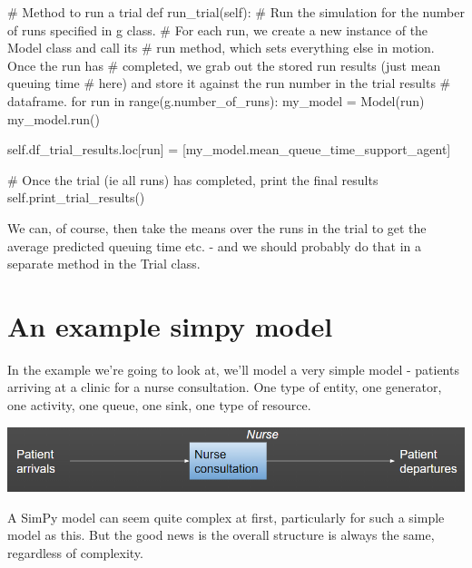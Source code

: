 \documentclass[
  letterpaper,
  DIV=11,
  numbers=noendperiod]{scrreprt}
\newenvironment{Shaded}{}{}
\newcommand{\BuiltInTok}[1]{\textcolor[rgb]{0.84,0.23,0.29}{#1}}
\newcommand{\CommentTok}[1]{\textcolor[rgb]{0.42,0.45,0.49}{#1}}
\newcommand{\ControlFlowTok}[1]{\textcolor[rgb]{0.84,0.23,0.29}{#1}}
\newcommand{\KeywordTok}[1]{\textcolor[rgb]{0.84,0.23,0.29}{#1}}
\newcommand{\NormalTok}[1]{\textcolor[rgb]{0.14,0.16,0.18}{#1}}
\newcommand{\OperatorTok}[1]{\textcolor[rgb]{0.14,0.16,0.18}{#1}}
\newcommand{\VariableTok}[1]{\textcolor[rgb]{0.89,0.38,0.04}{#1}}
\begin{document}
\begin{tcolorbox}
\begin{Shaded}
\begin{Highlighting}[]
    \CommentTok{\# Method to run a trial}
    \KeywordTok{def}\NormalTok{ run\_trial(}\VariableTok{self}\NormalTok{):}
        \CommentTok{\# Run the simulation for the number of runs specified in g class.}
        \CommentTok{\# For each run, we create a new instance of the Model class and call its}
        \CommentTok{\# run method, which sets everything else in motion.  Once the run has}
        \CommentTok{\# completed, we grab out the stored run results (just mean queuing time}
        \CommentTok{\# here) and store it against the run number in the trial results}
        \CommentTok{\# dataframe.}
        \ControlFlowTok{for}\NormalTok{ run }\KeywordTok{in} \BuiltInTok{range}\NormalTok{(g.number\_of\_runs):}
\NormalTok{            my\_model }\OperatorTok{=}\NormalTok{ Model(run)}
\NormalTok{            my\_model.run()}

            \VariableTok{self}\NormalTok{.df\_trial\_results.loc[run] }\OperatorTok{=}\NormalTok{ [my\_model.mean\_queue\_time\_support\_agent]}

        \CommentTok{\# Once the trial (ie all runs) has completed, print the final results}
        \VariableTok{self}\NormalTok{.print\_trial\_results()}
\end{Highlighting}
\end{Shaded}

\end{tcolorbox}

We can, of course, then take the means over the runs in the trial to get
the average predicted queuing time etc. - and we should probably do that
in a separate method in the Trial class.

\chapter{An example simpy model}\label{an-example-simpy-model}

In the example we're going to look at, we'll model a very simple model -
patients arriving at a clinic for a nurse consultation. One type of
entity, one generator, one activity, one queue, one sink, one type of
resource.

\includegraphics{images/example_simplest_model.png}

A SimPy model can seem quite complex at first, particularly for such a
simple model as this. But the good news is the overall structure is
always the same, regardless of complexity.
\end{document}

